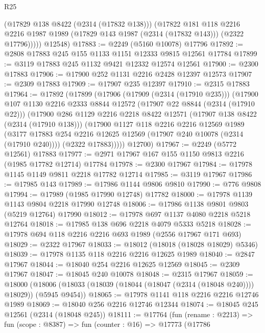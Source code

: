 \begin{lexlean}{R25}
\begin{coremodule}
            (@17829 @138 @8422 (@2314 (@17832 @138)))
            (@17822
              @181
              @118
              @2216
              @2216
              @1987
              @1989
              (@17829 @143 @1987 (@2314 (@17832 @143)))
              (@2322 @17796)))))
      @12548)
@17883 := @2249 (@5160 @10078) @17796
@17892 := @2808 @17883 @245 @155 @1133 @1151 @12333 @9815 @12561 @17784
@17899 := @3119 @17883 @245 @1132 @9421 @12332 @12574 @12561
@17900 := @2300 @17883
@17906 := @17900 @252 @1131 @2216 @2428 @12397 @12573
@17907 := @2309 @17883
@17909 := @17907 @235 @12397
@17910 := @2315 @17883
@17964 := @17892
    (@17899
      (@17906
        (@17909 (@2314 (@17910 @235)))
        (@17900
          @107
          @1130
          @2216
          @2333
          @8844
          @12572
          (@17907 @22 @8844 (@2314 (@17910 @22)))
          (@17900
            @286
            @1129
            @2216
            @2218
            @8422
            @12571
            (@17907 @138 @8422 (@2314 (@17910 @138)))
            (@17900
              @1127
              @118
              @2216
              @2216
              @12569
              @1989
              (@3177 @17883 @254 @2216 @12625 @12569 (@17907 @240 @10078 (@2314 (@17910 @240))))
              (@2322 @17883)))))
      @12700)
@17967 := @2249 (@5772 @12561) @17883
@17977 := @2971 @17967 @167 @155 @1150 @9813 @2216 (@1985 @17782 @12714) @17784
@17978 := @2300 @17967
@17984 := @17978 @1145 @1149 @9811 @2218 @17782 @12714
@17985 := @3119 @17967
@17986 := @17985 @143
@17989 := @17986 @1144 @9806 @9810
@17990 := @776 @9808
@17994 := @17989 (@1985 @17990 @12748) @17782
@18000 := @17978 @1139 @1143 @9804 @2218 @17990 @12748
@18006 := @17986 @1138 @9801 @9803 (@5219 @12764) @17990
@18012 := @17978 @697 @1137 @4080 @2218 @5218 @12764
@18018 := @17985 @138 @696 @2218 @4079 @5333 @5218
@18028 := @17978 @694 @118 @2216 @2216 @693 @1989 (@2556 @17967 @171 @693)
@18029 := @2322 @17967
@18033 := @18012 (@18018 (@18028 @18029) @5346)
@18039 := @17978 @1135 @118 @2216 @2216 @12625 @1989
@18040 := @2847 @17967
@18044 := @18040 @254 @2216 @12625 @12569
@18045 := @2309 @17967
@18047 := @18045 @240 @10078
@18048 := @2315 @17967
@18059 := @18000
    (@18006 (@18033 (@18039 (@18044 (@18047 (@2314 (@18048 @240)))) @18029)) (@5945 @9454))
@18065 := @17978 @1141 @118 @2216 @2216 @12746 @1989
@18069 := @18040 @256 @2216 @12746 @12344
@18074 := @18045 @245 @12561 (@2314 (@18048 @245))
@18111 := @17764
    (fun (rename : @2213) =>
    fun (scope : @8387) =>
    fun (counter : @16) =>
    @17773
      (@17786

\end{coremodule}
\end{lexlean}
